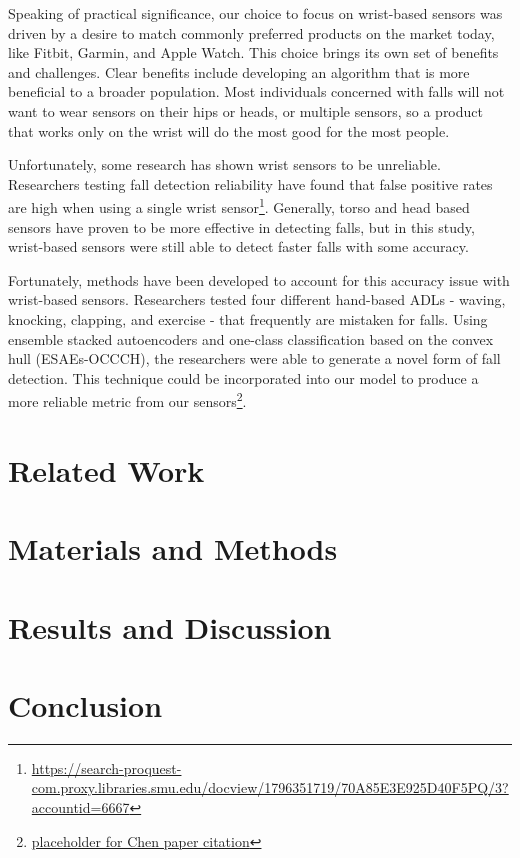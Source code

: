 \documentclass{llncs}
\begin{document}
	Speaking of practical significance, our choice to focus on wrist-based sensors was driven by a desire to match commonly preferred products on the market today, like Fitbit, Garmin, and Apple Watch. This choice brings its own set of benefits and challenges. Clear benefits include developing an algorithm that is more beneficial to a broader population. Most individuals concerned with falls will not want to wear sensors on their hips or heads, or multiple sensors, so a product that works only on the wrist will do the most good for the most people. 
	
	Unfortunately, some research has shown wrist sensors to be unreliable. Researchers testing fall detection reliability have found that false positive rates are high when using a single wrist sensor\footnote{\url{https://search-proquest-com.proxy.libraries.smu.edu/docview/1796351719/70A85E3E925D40F5PQ/3?accountid=6667}}. Generally, torso and head based sensors have proven to be more effective in detecting falls, but in this study, wrist-based sensors were still able to detect faster falls with some accuracy.
	
	Fortunately, methods have been developed to account for this accuracy issue with wrist-based sensors. Researchers tested four different hand-based ADLs - waving, knocking, clapping, and exercise - that frequently are mistaken for falls. Using ensemble stacked autoencoders and one-class classification based on the convex hull (ESAEs-OCCCH), the researchers were able to generate a novel form of fall detection. This technique could be incorporated into our model to produce a more reliable metric from our sensors\footnote{\url{placeholder for Chen paper citation}}.
	
\section{Related Work} %
\section{Materials and Methods}
\section{Results and Discussion}
\section{Conclusion}



%
%
 
 


\end{document}

